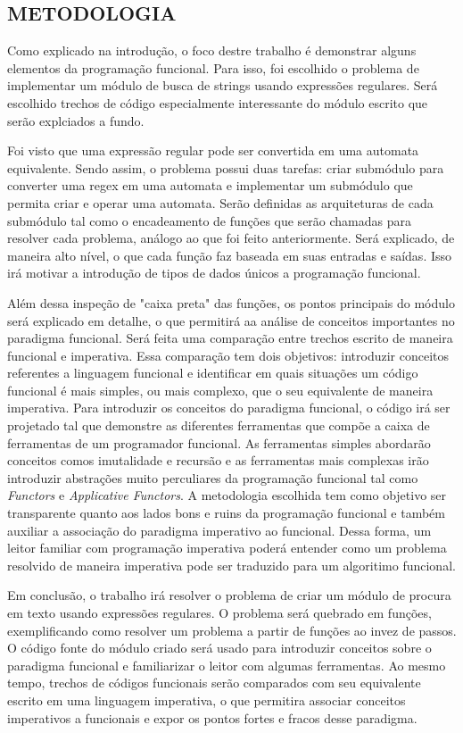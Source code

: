 \subsection{METODOLOGIA}

Como explicado na introdução, o foco destre trabalho é demonstrar alguns  elementos da programação funcional.
Para isso, foi escolhido o problema de implementar um módulo de busca de strings usando expressões regulares.
Será escolhido trechos de código especialmente interessante do módulo escrito que serão explciados a fundo.

Foi visto que uma expressão regular pode ser convertida em uma automata equivalente.
Sendo assim, o problema possui duas tarefas: criar submódulo para converter uma regex em uma automata e implementar um submódulo que permita criar e operar uma automata.
Serão definidas as arquiteturas de cada submódulo tal como o encadeamento de funções que serão chamadas para resolver cada problema, análogo ao que foi feito anteriormente.
Será explicado, de maneira alto nível, o que cada função faz baseada em suas entradas e saídas.
Isso irá motivar a introdução de tipos de dados únicos a programação funcional.

Além dessa inspeção de "caixa preta" das funções, os pontos principais do módulo será explicado em detalhe, o que permitirá aa análise de conceitos importantes no paradigma funcional.
Será feita uma comparação entre trechos escrito de maneira funcional e imperativa.
Essa comparação tem dois objetivos: introduzir conceitos referentes a linguagem funcional e identificar em quais situações um código funcional é mais simples, ou mais complexo, que o seu equivalente de maneira imperativa.
Para introduzir os conceitos do paradigma funcional, o código irá ser projetado tal que demonstre as diferentes ferramentas que compõe a caixa de ferramentas de um programador funcional.
As ferramentas simples abordarão conceitos comos imutalidade e recursão e as ferramentas mais complexas irão introduzir abstrações muito perculiares da programação funcional tal como \emph{Functors} e \emph{Applicative Functors}.
A metodologia escolhida tem como objetivo ser transparente quanto aos lados bons e ruins da programação funcional e também auxiliar a associação do paradigma imperativo ao funcional.
Dessa forma, um leitor familiar com programação imperativa poderá entender como um problema resolvido de maneira imperativa pode ser traduzido para um algoritimo funcional.

Em conclusão, o trabalho irá resolver o problema de criar um módulo de procura em texto usando expressões regulares.
O problema será quebrado em funções, exemplificando como resolver um problema a partir de funções ao invez de passos.
O código fonte do módulo criado será usado para introduzir conceitos sobre o paradigma funcional e familiarizar o leitor com algumas ferramentas.
Ao mesmo tempo, trechos de códigos funcionais serão comparados com seu equivalente escrito em uma linguagem imperativa, o que permitira associar conceitos imperativos a funcionais e expor os pontos fortes e fracos desse paradigma.
